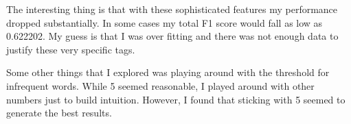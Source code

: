 \documentclass[10pt]{article}
\begin{document}
\begin{enumerate}
The interesting thing is that with these sophisticated features my performance dropped substantially. In some cases my total F1 score would fall as low as 0.622202. My guess is that I was over fitting and there was not enough data to justify these very specific tags.

Some other things that I explored was playing around with the threshold for infrequent words. While 5 seemed reasonable, I played around with other numbers just to build intuition. However, I found that sticking with 5 seemed to generate the best results.

\end{enumerate}
\end{document}
